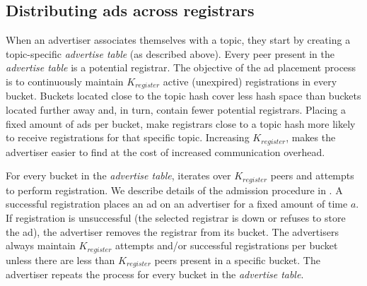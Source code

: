 \subsection{Distributing ads across registrars}\label{sec:registration_multi}
When an advertiser associates themselves with a topic, they start by creating a topic-specific \emph{advertise table} (as described above). 
Every peer present in the \emph{advertise table} is a potential registrar. 
The objective of the ad placement process is to continuously maintain $K_\textit{register}$ active (\ie unexpired) registrations in every bucket. 
Buckets located close to the topic hash cover less hash space than buckets located further away and, in turn, contain fewer potential registrars. 
Placing a fixed amount of ads per bucket, make registrars close to a topic hash more likely to receive registrations for that specific topic. 
Increasing $K_\textit{register}$, makes the advertiser easier to find at the cost of increased communication overhead. %


For every bucket in the \emph{advertise table}, iterates over
$K_{register}$ peers and attempts to perform registration.
We describe details of the admission procedure in . 
A successful registration places an ad on an advertiser for a fixed amount of time $a$.
If registration is unsuccessful (the selected registrar is down or refuses to store the ad), the advertiser removes the registrar from its bucket.
The advertisers always maintain $K_\textit{register}$ attempts and/or
successful registrations per bucket unless there are less than $K_\textit{register}$ peers present in a specific bucket.
The advertiser repeats the process for every bucket in the \emph{advertise table}. 

